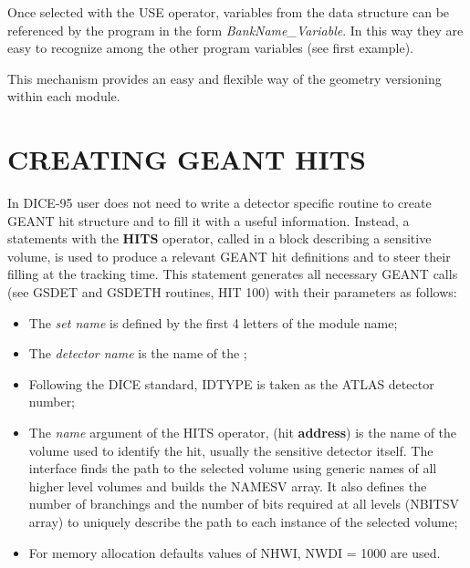  
Once selected with the USE operator, variables from the data
structure can be referenced by the program in the form
{\it     BankName\_Variable}.
In this way they are easy to recognize among the other
program variables (see first example).
 
This mechanism provides an easy and flexible way of the geometry
versioning within each module.
 
\section{CREATING GEANT HITS}

In DICE-95 user does not need to write a detector specific routine 
to create GEANT hit structure and to fill it with a useful information. 
Instead, a  \g statements  with the {\bf HITS} operator,
called in a block describing a sensitive volume, 
is used to produce a relevant GEANT hit definitions
and to steer their filling at the tracking time.
This statement generates all necessary GEANT calls (see GSDET
and GSDETH routines, HIT 100)
with their parameters as follows:

\begin{itemize}
\item  The {\it set name} is defined by the first 4 letters 
       of the {  module name}; 
\item  The {\it detector name} is the name of the  ;
\item  Following the DICE standard, IDTYPE is taken as the ATLAS
       detector number;
\item  The {\it name} argument of the HITS operator, (hit {\bf address})
       is the name of the volume used to identify  the hit, 
       usually the sensitive detector itself.
       The \as interface finds the path to the selected volume 
       using generic names of all higher level volumes 
       and builds the NAMESV array.
       It also defines the number of branchings and 
       the number of bits required at all levels (NBITSV array)
       to uniquely describe the path to each instance of the
       selected volume;
\item  For memory allocation defaults values of NHWI, NWDI = 1000 are used.
\end{itemize}
 

